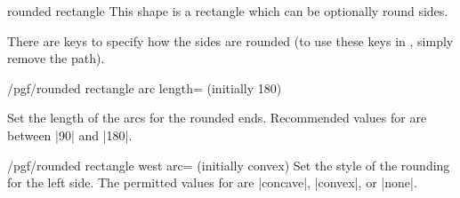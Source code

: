 \begin{shape}{rounded rectangle}
	This shape is a rectangle which can be optionally round sides.

\begin{codeexample}[]
\end{codeexample}

	There are keys to specify how the sides are rounded (to use
	these keys in \tikzname, simply remove the  path).


\begin{key}{/pgf/rounded rectangle arc length= (initially 180)}

	Set the length of the arcs for the rounded ends. Recommended values
	for	 are between |90| and |180|.
	
\begin{codeexample}[]
\end{codeexample}

\end{key}

\begin{key}{/pgf/rounded rectangle west arc= (initially convex)}
	Set the style of the rounding for the left side. The permitted values
	for  are |concave|, |convex|, or |none|.

\begin{codeexample}[]
\end{codeexample}
\end{key}


\end{shape}
